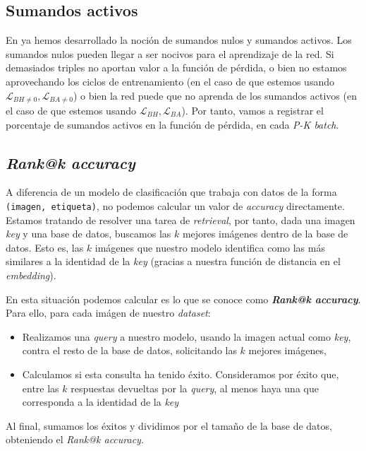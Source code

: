 \subsection{Sumandos activos}

En  ya hemos desarrollado la noción de sumandos nulos y sumandos activos. Los sumandos nulos pueden llegar a ser nocivos para el aprendizaje de la red. Si demasiados triples no aportan valor a la función de pérdida, o bien no estamos aprovechando los ciclos de entrenamiento (en el caso de que estemos usando $\mathcal{L}_{BH \neq 0}, \mathcal{L}_{BA \neq 0}$) o bien  la red puede que no aprenda de los sumandos activos (en el caso de que estemos usando $\mathcal{L}_{BH}, \mathcal{L}_{BA}$). Por tanto, vamos a registrar el porcentaje de sumandos activos en la función de pérdida, en cada \textit{P-K batch}.

\subsection{\textit{Rank@k accuracy}} \label{isubs:rank_at_k}

A diferencia de un modelo de clasificación que trabaja con datos de la forma \lstinline{(imagen, etiqueta)}, no podemos calcular un valor de \textit{accuracy} directamente. Estamos tratando de resolver una tarea de \textit{retrieval}, por tanto, dada una imagen \textit{key} y una base de datos, buscamos las $k$  mejores imágenes dentro de la base de datos. Esto es, las $k$ imágenes que nuestro modelo identifica como las más similares a la identidad de la \textit{key} (gracias a nuestra función de distancia en el \textit{embedding}).

En esta situación podemos calcular es lo que se conoce como \textbf{\textit{Rank@k accuracy}}. Para ello, para cada imágen de nuestro \textit{dataset}:

\begin{itemize}
    \item Realizamos una \textit{query} a nuestro modelo, usando la imagen actual como \textit{key}, contra el resto de la base de datos, solicitando las $k$ mejores imágenes,
    \item Calculamos si esta consulta ha tenido éxito. Consideramos por éxito que, entre las $k$ respuestas devueltas por la \textit{query}, al menos haya una que corresponda a la identidad de la \textit{key}
\end{itemize}

Al final, sumamos los éxitos y dividimos por el tamaño de la base de datos, obteniendo el \textit{Rank@k accuracy}.

